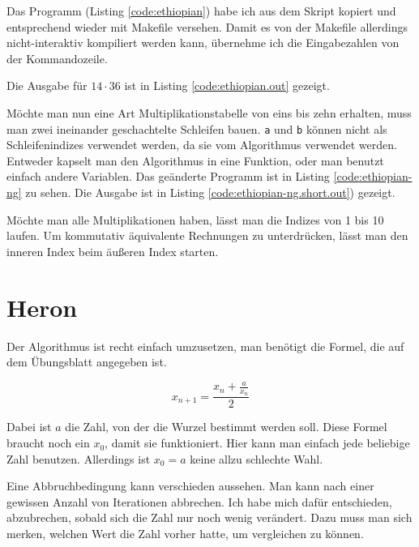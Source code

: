 Das Programm (Listing \ref{code:ethiopian}) habe ich aus dem Skript kopiert und entsprechend wieder mit Makefile versehen. Damit es von der Makefile allerdings nicht-interaktiv kompiliert werden kann, übernehme ich die Eingabezahlen von der Kommandozeile.


Die Ausgabe für $14 \cdot 36$ ist in Listing \ref{code:ethiopian.out} gezeigt.


Möchte man nun eine Art Multiplikationstabelle von eins bis zehn erhalten, muss man zwei ineinander geschachtelte Schleifen bauen. \texttt{a} und \texttt{b} können nicht als Schleifenindizes verwendet werden, da sie vom Algorithmus verwendet werden. Entweder kapselt man den Algorithmus in eine Funktion, oder man benutzt einfach andere Variablen. Das geänderte Programm ist in Listing \ref{code:ethiopian-ng} zu sehen. Die Ausgabe ist in Listing \ref{code:ethiopian-ng.short.out}) gezeigt.



Möchte man alle Multiplikationen haben, lässt man die Indizes von 1 bis 10 laufen. Um kommutativ äquivalente Rechnungen zu unterdrücken, lässt man den inneren Index beim äußeren Index starten.

\section{Heron}

Der Algorithmus ist recht einfach umzusetzen, man benötigt die Formel, die auf dem Übungsblatt angegeben ist.

\begin{equation}
x_{n+1}=\frac{x_n+\frac{a}{x_n}}{2}
\end{equation}

Dabei ist $a$ die Zahl, von der die Wurzel bestimmt werden soll. Diese Formel braucht noch ein $x_0$, damit sie funktioniert. Hier kann man einfach jede beliebige Zahl benutzen. Allerdings ist $x_0=a$ keine allzu schlechte Wahl.

Eine Abbruchbedingung kann verschieden aussehen. Man kann nach einer gewissen Anzahl von Iterationen abbrechen. Ich habe mich dafür entschieden, abzubrechen, sobald sich die Zahl nur noch wenig verändert. Dazu muss man sich merken, welchen Wert die Zahl vorher hatte, um vergleichen zu können.


